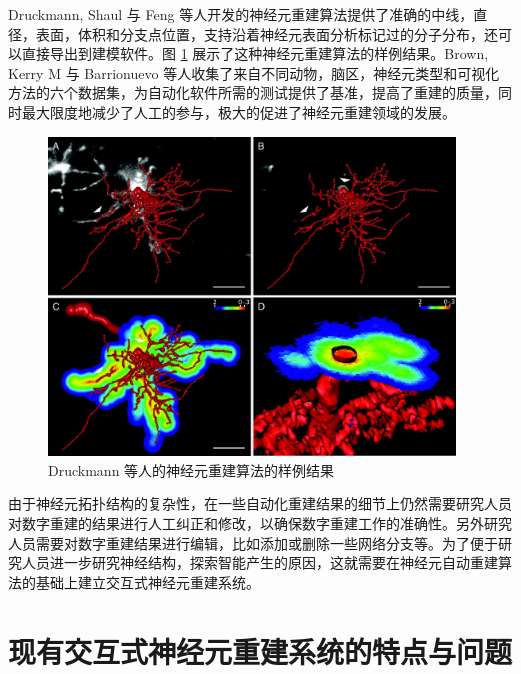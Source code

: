 Druckmann, Shaul 与 Feng 等人开发的神经元重建算法提供了准确的中线，直径，表面，体积和分支点位置，支持沿着神经元表面分析标记过的分子分布，还可以直接导出到建模软件。图 \ref{Druckmann} 展示了这种神经元重建算法的样例结果。Brown, Kerry M 与 Barrionuevo 等人收集了来自不同动物，脑区，神经元类型和可视化方法的六个数据集，为自动化软件所需的测试提供了基准，提高了重建的质量，同时最大限度地减少了人工的参与，极大的促进了神经元重建领域的发展。

\begin{figure}
\centering
\includegraphics[width=108mm]{images/Druckmann}
\caption{Druckmann 等人的神经元重建算法的样例结果}
\label{Druckmann}
\end{figure}

由于神经元拓扑结构的复杂性，在一些自动化重建结果的细节上仍然需要研究人员对数字重建的结果进行人工纠正和修改，以确保数字重建工作的准确性。另外研究人员需要对数字重建结果进行编辑，比如添加或删除一些网络分支等。为了便于研究人员进一步研究神经结构，探索智能产生的原因，这就需要在神经元自动重建算法的基础上建立交互式神经元重建系统。

\section{现有交互式神经元重建系统的特点与问题}
